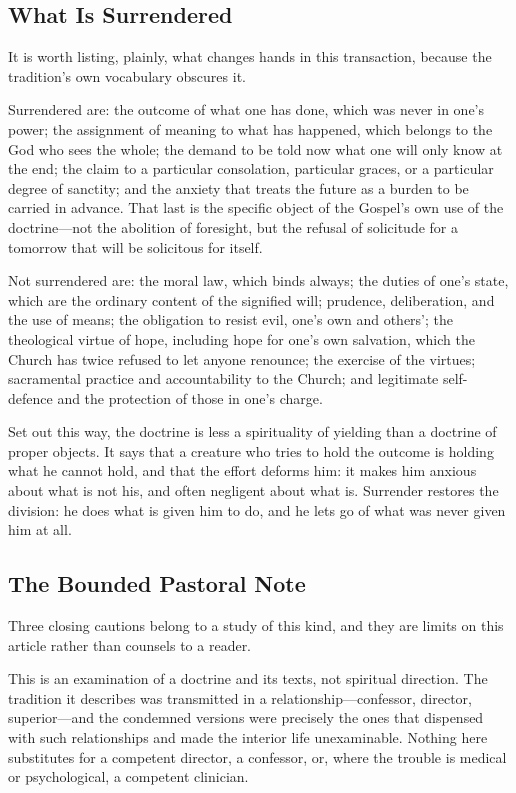 \subsection{What Is Surrendered}

It is worth listing, plainly, what changes hands in this transaction, because the tradition's own vocabulary obscures it.

Surrendered are: the outcome of what one has done, which was never in one's power; the assignment of meaning to what has happened, which belongs to the God who sees the whole; the demand to be told now what one will only know at the end; the claim to a particular consolation, particular graces, or a particular degree of sanctity; and the anxiety that treats the future as a burden to be carried in advance. That last is the specific object of the Gospel's own use of the doctrine---not the abolition of foresight, but the refusal of solicitude for a tomorrow that will be solicitous for itself.

Not surrendered are: the moral law, which binds always; the duties of one's state, which are the ordinary content of the signified will; prudence, deliberation, and the use of means; the obligation to resist evil, one's own and others'; the theological virtue of hope, including hope for one's own salvation, which the Church has twice refused to let anyone renounce; the exercise of the virtues; sacramental practice and accountability to the Church; and legitimate self-defence and the protection of those in one's charge.

Set out this way, the doctrine is less a spirituality of yielding than a doctrine of proper objects. It says that a creature who tries to hold the outcome is holding what he cannot hold, and that the effort deforms him: it makes him anxious about what is not his, and often negligent about what is. Surrender restores the division: he does what is given him to do, and he lets go of what was never given him at all.

\subsection{The Bounded Pastoral Note}

Three closing cautions belong to a study of this kind, and they are limits on this article rather than counsels to a reader.

This is an examination of a doctrine and its texts, not spiritual direction. The tradition it describes was transmitted in a relationship---confessor, director, superior---and the condemned versions were precisely the ones that dispensed with such relationships and made the interior life unexaminable. Nothing here substitutes for a competent director, a confessor, or, where the trouble is medical or psychological, a competent clinician.

